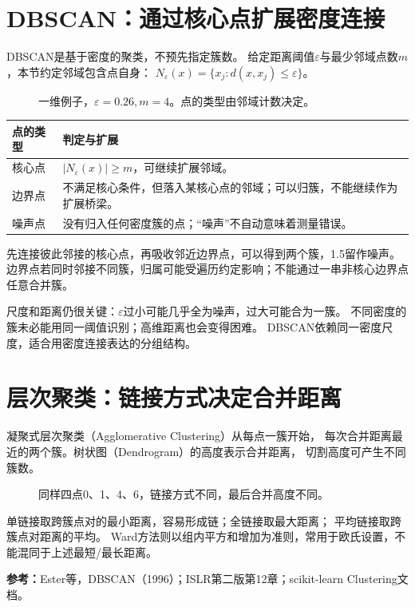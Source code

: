 \section{DBSCAN：通过核心点扩展密度连接}
\label{sec:unsup-dbscan}
DBSCAN是基于密度的聚类，不预先指定簇数。
给定距离阈值$\varepsilon$与最少邻域点数$m$，本节约定邻域包含点自身：
$N_\varepsilon(x)=\{x_j:d(x,x_j)\leq\varepsilon\}$。

\begin{figure}[htbp]
\centering
\caption{一维例子，$\varepsilon=0.26,m=4$。点的类型由邻域计数决定。}
\par\smallskip
{}
\end{figure}

\begin{center}
\begin{tabularx}{\textwidth}{P{28mm}Y}
\toprule
点的类型 & 判定与扩展\\
\midrule
核心点 & $|N_\varepsilon(x)|\geq m$，可继续扩展邻域。\\
边界点 & 不满足核心条件，但落入某核心点的邻域；可以归簇，不能继续作为扩展桥梁。\\
噪声点 & 没有归入任何密度簇的点；“噪声”不自动意味着测量错误。\\
\bottomrule
\end{tabularx}
\end{center}

先连接彼此邻接的核心点，再吸收邻近边界点，可以得到两个簇，1.5留作噪声。
边界点若同时邻接不同簇，归属可能受遍历约定影响；不能通过一串非核心边界点任意合并簇。

尺度和距离仍很关键：$\varepsilon$过小可能几乎全为噪声，过大可能合为一簇。
不同密度的簇未必能用同一阈值识别；高维距离也会变得困难。
DBSCAN依赖同一密度尺度，适合用密度连接表达的分组结构。

\section{层次聚类：链接方式决定合并距离}
\label{sec:unsup-hierarchy}
凝聚式层次聚类（Agglomerative Clustering）从每点一簇开始，
每次合并距离最近的两个簇。树状图（Dendrogram）的高度表示合并距离，
切割高度可产生不同簇数。

\begin{figure}[htbp]
\centering
\caption{同样四点0、1、4、6，链接方式不同，最后合并高度不同。}
\par\smallskip
{}
\end{figure}

单链接取跨簇点对的最小距离，容易形成链；全链接取最大距离；
平均链接取跨簇点对距离的平均。
Ward方法则以组内平方和增加为准则，常用于欧氏设置，不能混同于上述最短/最长距离。


\begingroup\small
\noindent\textbf{参考：}Ester等，DBSCAN（1996）；ISLR第二版第12章；scikit-learn Clustering文档。
\par\endgroup

